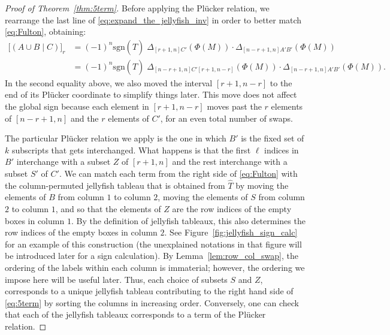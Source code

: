 \documentclass[ALCO, Unicode]{cedram}
\numberwithin{equation}{section}
\newcommand{\sgn}{\mathrm{sgn}}
\begin{document}
\begin{proof}[Proof of Theorem~\ref{thm:5term}]
Before applying the Pl\"ucker relation, we rearrange the last line of \eqref{eq:expand_the_jellyfish_inv} in order to better match \eqref{eq:Fulton}, obtaining:
\begin{equation}\label{eq:expand_the_jellyfish_inv_some_more}
\begin{split}
        \big[(A\cup B \mid C)\big]_r 
        &= (-1)^n \sgn(\widehat{T}) \;   \Delta_{[r+1, n]  C'}(\Phi(M)) \cdot \Delta_{[n-r + 1, n]  A'B'}(\Phi(M)) \\
        &= (-1)^n \sgn(\widehat{T}) \;   \Delta_{[n-r+1, n]  C'  [r+1,n-r]}(\Phi(M)) \cdot \Delta_{[n-r + 1, n]  A' B'}(\Phi(M)). 
        \end{split}
        \end{equation}
In the second equality above, we also moved the interval $[r+1,n-r]$ to the end of its Pl\"ucker coordinate to simplify things later. This move does not affect the global sign because each element in $[r+1,n-r]$ moves past the $r$ elements of $[n-r+1,n]$ and the $r$ elements of $C'$, for an even total number of swaps.

The particular Pl\"ucker relation we apply is the one in which $B'$ is the fixed set of $k$ subscripts that gets interchanged. What happens is that the first $\ell$ indices in $B'$ interchange with a subset $Z$ of $[r+1,n]$ and the rest interchange with a subset $S'$ of $C'$. We can match each term from the right side of \eqref{eq:Fulton} with the column-permuted jellyfish tableau that is obtained from $\widehat{T}$ by moving the elements of $B$ from column $1$ to column $2$, moving the elements of $S$ from column $2$ to column $1$, and so that the elements of $Z$ are the row indices of the empty boxes in column $1$. By the definition of jellyfish tableaux, this also determines the row indices of the empty boxes in column $2$. See Figure~\ref{fig:jellyfish_sign_calc} for an example of this construction (the unexplained notations in that figure will be introduced later for a sign calculation). By Lemma~\ref{lem:row_col_swap}, the ordering of the labels within each column is immaterial; however, the ordering we impose here will be useful later. Thus, each choice of subsets $S$ and $Z$, corresponds to a unique jellyfish tableau contributing to the right hand side of \eqref{eq:5term} by sorting the columns in increasing order. Conversely, one can check that each of the jellyfish tableaux corresponds to a term of the Pl\"ucker relation.


\end{proof}
\end{document}
